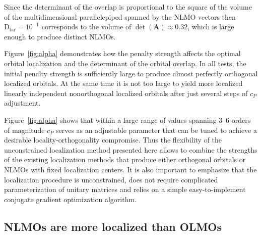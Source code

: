 \documentclass[aps,prl,reprint,amsmath,amssymb]{revtex4-1}
\begin{document}
Since the determinant of the overlap is proportional to the square of the volume of the multidimensional parallelepiped spanned by the NLMO vectors then $\text{D}_{\text{tar}}=10^{-1}$ corresponds to the volume of $\det(\mathbf{A})\approx 0.32$, which is large enough to produce distinct NLMOs.

Figure~\ref{fig:alpha} demonstrates how the penalty strength affects the optimal orbital localization and the determinant of the orbital overlap. In all tests, the initial penalty strength is sufficiently large to produce almost perfectly orthogonal localized orbitals. At the same time it is not too large to yield more localized linearly independent nonorthogonal localized orbitals after just several steps of $c_P$ adjustment. %

Figure~\ref{fig:alpha} shows that within a large range of values spanning 3--6 orders of magnitude $c_P$ serves as an adjustable parameter that can be tuned to achieve a desirable locality-orthogonality compromise. 
Thus the flexibility of the unconstrained localization method presented here allows to combine the strengths of the existing localization methods that produce either orthogonal orbitals or NLMOs with fixed localization centers. It is also important to emphasize that the localization procedure is unconstrained, does not require complicated parameterization of unitary matrices and relies on a simple easy-to-implement conjugate gradient optimization algorithm. 


\subsection{NLMOs are more localized than OLMOs}
\end{document}
